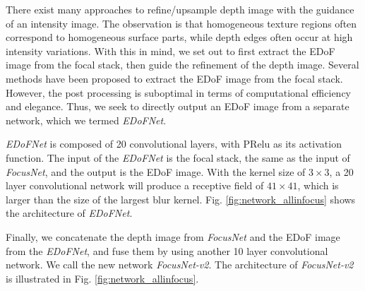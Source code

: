 \documentclass[10pt,twocolumn,letterpaper]{article}
\begin{document}
There exist many approaches \cite{ferstl13, hui16} to refine/upsample depth image with the guidance of an intensity image. The observation is that homogeneous texture regions often correspond to homogeneous surface parts, while depth edges often occur at high intensity variations. With this in mind, we set out to first extract the EDoF image from the focal stack, then guide the refinement of the depth image. Several methods \cite{kuthirummal11, suwajanakorn15} have been proposed to extract the EDoF image from the focal stack. However, the post processing is suboptimal
in terms of computational efficiency and elegance. Thus, we seek to directly output an EDoF image from a separate network, which we termed \emph{EDoFNet}.

\emph{EDoFNet} is composed of 20 convolutional layers, with PRelu as its activation function. The input of the \emph{EDoFNet} is the focal stack, the same as the input of \emph{FocusNet}, and the output is the EDoF image. With the kernel size of $3\times3$, a 20 layer convolutional network will produce a receptive field of $41\times41$, which is larger than the size of the largest blur kernel. Fig. \ref{fig:network_allinfocus} shows the architecture of \emph{EDoFNet}.

Finally, we concatenate the depth image from \emph{FocusNet} and the EDoF image from the \emph{EDoFNet}, and fuse them by using another 10 layer convolutional network. We call the new network \emph{FocusNet-v2}. The architecture of \emph{FocusNet-v2} is illustrated in Fig. \ref{fig:network_allinfocus}.
\end{document}

